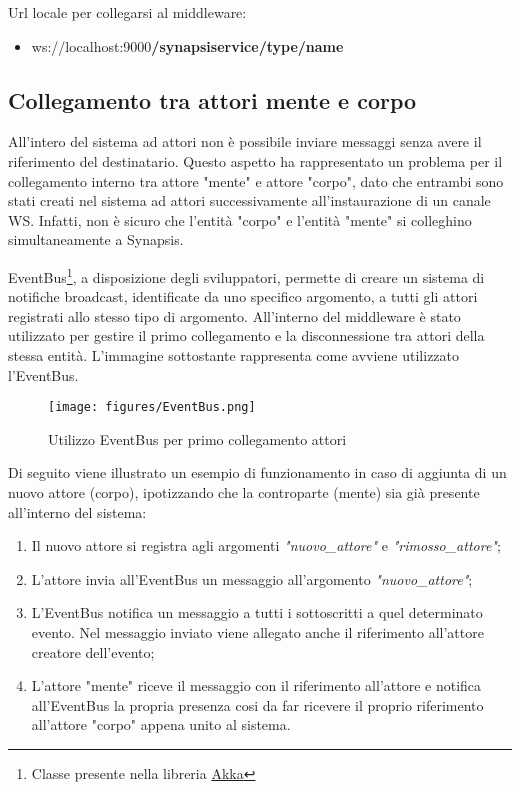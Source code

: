 
Url locale per collegarsi al middleware:
\begin{itemize}
    \item ws://localhost:9000\textbf{/synapsiservice/type/name}
\end{itemize}

\subsection{Collegamento tra attori mente e corpo} \label{soluzione_collegamento_attori}

All'intero del sistema ad attori non è possibile inviare messaggi senza avere il riferimento del destinatario. Questo aspetto ha rappresentato un problema per il collegamento interno tra attore "mente" e attore "corpo", dato che entrambi sono stati creati nel sistema ad attori successivamente all'instaurazione di un canale WS. Infatti, non è sicuro che l'entità "corpo" e l'entità "mente" si colleghino simultaneamente a Synapsis.

\medskip

EventBus\footnote{Classe presente nella libreria \href{https://doc.akka.io/docs/akka/current/event-bus.html}{Akka}}, a disposizione degli sviluppatori, permette di creare un sistema di notifiche broadcast, identificate da uno specifico argomento, a tutti gli attori registrati allo stesso tipo di argomento. All'interno del middleware è stato utilizzato per gestire il primo collegamento e la disconnessione tra attori della stessa entità. L'immagine sottostante rappresenta come avviene utilizzato l'EventBus.

\begin{figure}[H]
\centering
\texttt{[image: figures/EventBus.png]}
\caption{Utilizzo EventBus per primo collegamento attori}
\end{figure}

Di seguito viene illustrato un esempio di funzionamento in caso di aggiunta di un nuovo attore (corpo), ipotizzando che la controparte (mente) sia già presente all'interno del sistema:
\begin{enumerate}
    \item Il nuovo attore si registra agli argomenti \textit{"nuovo\_attore"} e \textit{"rimosso\_attore"};
    \item L'attore invia all'EventBus un messaggio all'argomento \textit{"nuovo\_attore"};
    \item L'EventBus notifica un messaggio a tutti i sottoscritti a quel determinato evento. Nel messaggio inviato viene allegato anche il riferimento all'attore creatore dell'evento;
    \item L'attore "mente" riceve il messaggio con il riferimento all'attore e notifica all'EventBus la propria presenza cosi da far ricevere il proprio riferimento all'attore "corpo" appena unito al sistema.
\end{enumerate}

